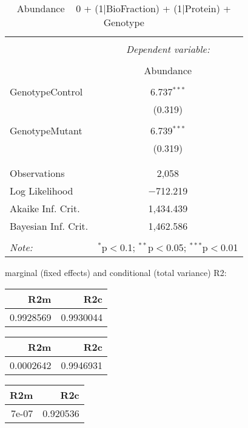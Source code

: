 \documentclass[11pt]{report}
\begin{document}
\begin{table}[!htbp] \centering 
  \caption{Abundance ~ 0 + (1|BioFraction) + (1|Protein) + Genotype} 
  \label{} 
\begin{tabular}{@{\extracolsep{5pt}}lc} 
\\[-1.8ex]\hline 
\hline \\[-1.8ex] 
 & \multicolumn{1}{c}{\textit{Dependent variable:}} \\ 
\cline{2-2} 
\\[-1.8ex] & Abundance \\ 
\hline \\[-1.8ex] 
 GenotypeControl & 6.737$^{***}$ \\ 
  & (0.319) \\ 
  & \\ 
 GenotypeMutant & 6.739$^{***}$ \\ 
  & (0.319) \\ 
  & \\ 
\hline \\[-1.8ex] 
Observations & 2,058 \\ 
Log Likelihood & $-$712.219 \\ 
Akaike Inf. Crit. & 1,434.439 \\ 
Bayesian Inf. Crit. & 1,462.586 \\ 
\hline 
\hline \\[-1.8ex] 
\textit{Note:}  & \multicolumn{1}{r}{$^{*}$p$<$0.1; $^{**}$p$<$0.05; $^{***}$p$<$0.01} \\ 
\end{tabular} 
\end{table} 
marginal (fixed effects) and conditional (total variance) R2:

\begin{tabular}{r|r}
\hline
R2m & R2c\\
\hline
0.9928569 & 0.9930044\\
\hline
\end{tabular}

\begin{tabular}{r|r}
\hline
R2m & R2c\\
\hline
0.0002642 & 0.9946931\\
\hline
\end{tabular}

\begin{tabular}{r|r}
\hline
R2m & R2c\\
\hline
7e-07 & 0.920536\\
\hline
\end{tabular}
\end{document}
